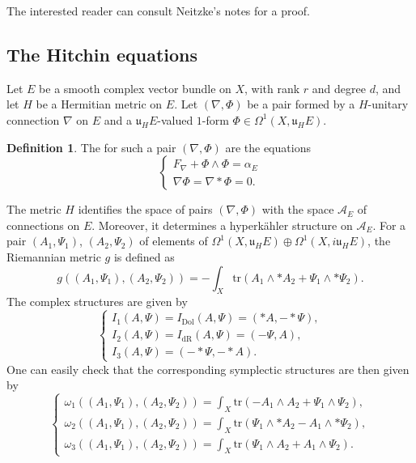 \documentclass[12pt,a4paper]{amsbook}
\theoremstyle{remark} \newtheorem{rmk}[thm]{Remark}
\theoremstyle{definition} \newtheorem{defn}[thm]{Definition}
\theoremstyle{definition} \newtheorem{ex}[thm]{Example}
\theoremstyle{definition} \newtheorem{ej}{Exercise}
\let\emph\relax
\newcommand{\cA}{\mathcal A}
\newcommand{\fu}{\mathfrak u}
\newcommand{\dR}{\mathrm{dR}}
\newcommand{\Dol}{\mathrm{Dol}}
\begin{document}
The interested reader can consult Neitzke's notes \cite[Theorem 3.49]{Neitzke} for a proof.

\subsection*{The Hitchin equations}
Let $E$ be a smooth complex vector bundle on $X$, with rank $r$ and degree $d$, and let $H$ be a Hermitian metric on $E$. Let $(\nabla,\Phi)$ be a pair formed by a $H$-unitary connection $\nabla$ on $E$ and a $\fu_H E$-valued $1$-form $\Phi\in \Omega^1(X,\fu_H E)$.

\begin{defn}
  The \emph{Hitchin equations} for such a pair $(\nabla,\Phi)$ are the equations
  \begin{equation*}
\begin{cases}
  F_\nabla + \Phi \wedge \Phi = \alpha_E \\
  \nabla \Phi = \nabla * \Phi = 0.
\end{cases}
  \end{equation*}

\end{defn}

The metric $H$ identifies the space of pairs $(\nabla,\Phi)$ with the space $\cA_E$ of connections on $E$. Moreover, it determines a hyperkähler structure on $\cA_E$. For a pair $(A_1,\Psi_1)$, $(A_2,\Psi_2)$ of elements of $\Omega^1(X,\fu_H E) \oplus \Omega^1(X,i\fu_H E)$, the Riemannian metric $g$ is defined as
\begin{equation*}
g((A_1,\Psi_1), (A_2,\Psi_2)) = -\int_X \mathrm{tr} (A_1 \wedge * A_2 + \Psi_1 \wedge * \Psi_2).
\end{equation*}
The complex structures are given by
\begin{equation*}
  \begin{cases}
I_1(A,\Psi)=I_{\Dol}(A,\Psi) = (*A,-*\Psi),\\ I_2(A,\Psi)=I_{\dR}(A,\Psi)=(-\Psi,A),\\ I_3(A,\Psi)=(-*\Psi,-*A).
  \end{cases}
\end{equation*}
One can easily check that the corresponding symplectic structures are then given by
\begin{equation*}
\begin{cases}
\omega_1((A_1,\Psi_1), (A_2,\Psi_2))= \int_X \mathrm{tr}(-A_1\wedge A_2 + \Psi_1 \wedge \Psi_2), \\
\omega_2((A_1,\Psi_1), (A_2,\Psi_2))= \int_X \mathrm{tr}(\Psi_1\wedge * A_2 - A_1 \wedge * \Psi_2), \\
\omega_3((A_1,\Psi_1), (A_2,\Psi_2))= \int_X \mathrm{tr}(\Psi_1\wedge A_2 + A_1 \wedge \Psi_2).
\end{cases}
\end{equation*}
\end{document}
